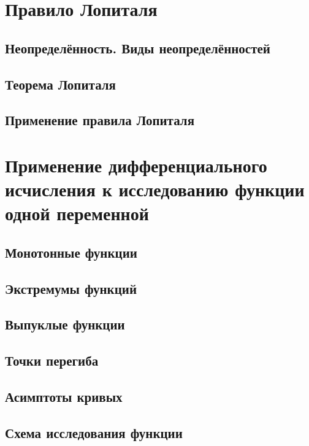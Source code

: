 \section{Правило Лопиталя}
\subsection{Неопределённость. Виды неопределённостей}

\subsection{Теорема Лопиталя}
%
\subsection{Применение правила Лопиталя}

\section{Применение дифференциального исчисления к исследованию функции одной переменной}
\subsection{Монотонные функции}

\subsection{Экстремумы функций}

\subsection{Выпуклые функции}

\subsection{Точки перегиба}

\subsection{Асимптоты кривых}

\subsection{Схема исследования функции}



